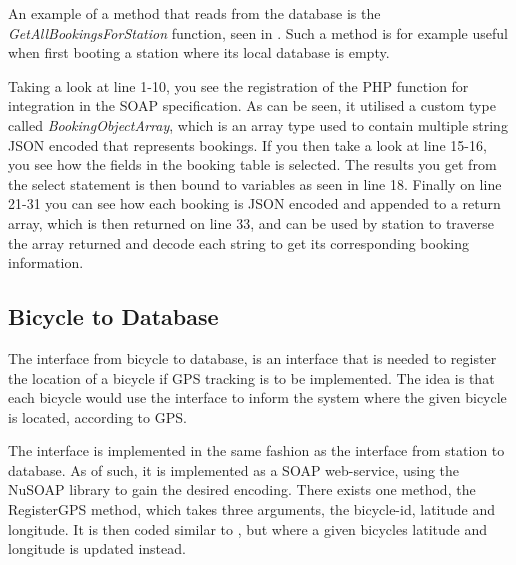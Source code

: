 An example of a method that reads from the database is the \textit{GetAllBookingsForStation} function, seen in .
Such a method is for example useful when first booting a station where its local database is empty.

Taking a look at line 1-10, you see the registration of the PHP function for integration in the SOAP specification.
As can be seen, it utilised a custom type called \textit{BookingObjectArray}, which is an array type used to contain multiple string JSON encoded that represents bookings.
If you then take a look at line 15-16, you see how the fields in the booking table is selected.
The results you get from the select statement is then bound to variables as seen in line 18.
Finally on line 21-31 you can see how each booking is JSON encoded and appended to a return array, which is then returned on line 33, and can be used by station to traverse the array returned and decode each string to get its corresponding booking information.

\subsection{Bicycle to Database}
The interface from bicycle to database, is an interface that is needed to register the location of a bicycle if GPS tracking is to be implemented.
The idea is that each bicycle would use the interface to inform the system where the given bicycle is located, according to GPS.

The interface is implemented in the same fashion as the interface from station to database.
As of such, it is implemented as a SOAP web-service, using the NuSOAP library to gain the desired encoding.
There exists one method, the RegisterGPS method, which takes three arguments, the bicycle-id, latitude and longitude.
It is then coded similar to , but where a given bicycles latitude and longitude is updated instead.
